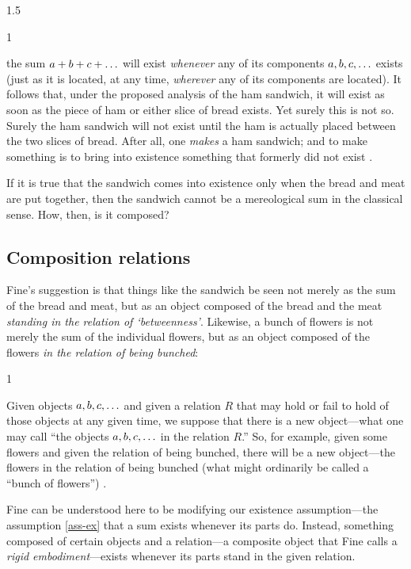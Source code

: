 \documentclass[11pt]{article}
\newenvironment{squote}{%
\begin{spacing}{1}
\begin{list}{}{%
\setlength{\labelwidth}{0pt}%
\rightmargin\leftmargin%
}
\item\relax
}{%
\end{list}%
\end{spacing}
}
\begin{document}
\begin{spacing}{1.5}
\begin{squote}
the sum $a + b + c + \mathellipsis $ will exist {\em whenever} any of
its components $a, b, c, \mathellipsis $ exists (just as it is
located, at any time, {\em wherever} any of its components are
located).  It follows that, under the proposed analysis of the ham
sandwich, it will exist as soon as the piece of ham or either slice of
bread exists.  Yet surely this is not so.  Surely the ham sandwich
will not exist until the ham is actually placed between the two slices
of bread.  After all, one {\em makes} a ham sandwich; and to make
something is to bring into existence something that formerly did not
exist \citep[62]{fine1999}.
\end{squote}

If it is true that the sandwich comes into existence only when the
bread and meat are put together, then the sandwich cannot be a
mereological sum in the classical sense.  How, then, is it composed?

\subsection{Composition relations}
\label{rigid}
Fine's suggestion is that things like the sandwich be seen not merely
as the sum of the bread and meat, but as an object composed of the
bread and the meat {\em standing in the relation of `betweenness'}.
Likewise, a bunch of flowers is not merely the sum of the individual
flowers, but as an object composed of the flowers {\em in the relation
  of being bunched}:

\begin{squote}
Given objects $a, b, c, \mathellipsis $ and given a relation $R$ that
may hold or fail to hold of those objects at any given time, we
suppose that there is a new object---what one may call ``the objects
$a, b, c, \mathellipsis $ in the relation $R$.''  So, for example,
given some flowers and given the relation of being bunched, there will
be a new object---the flowers in the relation of being bunched (what
might ordinarily be called a ``bunch of flowers'')
\citeyearpar[65]{fine1999}.
\end{squote}

Fine can be understood here to be modifying our existence
assumption---the assumption \ref{ass-ex} that a sum exists whenever
its parts do.  Instead, something composed of certain objects and a
relation---a composite object that Fine calls a {\em rigid
  embodiment}---exists whenever its parts stand in the given relation.


\end{spacing}
\end{document}

